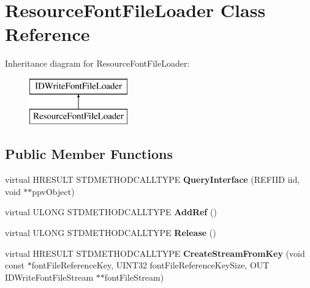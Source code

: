 \hypertarget{class_resource_font_file_loader}{\section{Resource\-Font\-File\-Loader Class Reference}
\label{class_resource_font_file_loader}
}
Inheritance diagram for Resource\-Font\-File\-Loader\-:\begin{figure}[H]
\begin{center}
\leavevmode
\includegraphics[height=2.000000cm]{class_resource_font_file_loader}
\end{center}
\end{figure}
\subsection*{Public Member Functions}
\begin{DoxyCompactItemize}
\item 
\hypertarget{class_resource_font_file_loader_ac63a6457122ddcca3692af48e2c0855a}{virtual H\-R\-E\-S\-U\-L\-T S\-T\-D\-M\-E\-T\-H\-O\-D\-C\-A\-L\-L\-T\-Y\-P\-E {\bfseries Query\-Interface} (R\-E\-F\-I\-I\-D iid, void $\ast$$\ast$ppv\-Object)}\label{class_resource_font_file_loader_ac63a6457122ddcca3692af48e2c0855a}

\item 
\hypertarget{class_resource_font_file_loader_a45ee198b69c353f36f255042874e0aaa}{virtual U\-L\-O\-N\-G S\-T\-D\-M\-E\-T\-H\-O\-D\-C\-A\-L\-L\-T\-Y\-P\-E {\bfseries Add\-Ref} ()}\label{class_resource_font_file_loader_a45ee198b69c353f36f255042874e0aaa}

\item 
\hypertarget{class_resource_font_file_loader_a9fba78074003205b21cb24d8ebf5adec}{virtual U\-L\-O\-N\-G S\-T\-D\-M\-E\-T\-H\-O\-D\-C\-A\-L\-L\-T\-Y\-P\-E {\bfseries Release} ()}\label{class_resource_font_file_loader_a9fba78074003205b21cb24d8ebf5adec}

\item 
\hypertarget{class_resource_font_file_loader_a024531ae4bd559d252ffbe4c9bbf6147}{virtual H\-R\-E\-S\-U\-L\-T S\-T\-D\-M\-E\-T\-H\-O\-D\-C\-A\-L\-L\-T\-Y\-P\-E {\bfseries Create\-Stream\-From\-Key} (void const $\ast$font\-File\-Reference\-Key, U\-I\-N\-T32 font\-File\-Reference\-Key\-Size, O\-U\-T I\-D\-Write\-Font\-File\-Stream $\ast$$\ast$font\-File\-Stream)}\label{class_resource_font_file_loader_a024531ae4bd559d252ffbe4c9bbf6147}

\end{DoxyCompactItemize}
